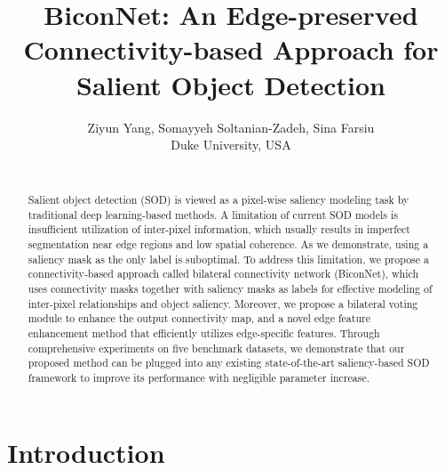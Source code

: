 \documentclass[review]{cvpr}
\begin{document}
\title{BiconNet: An Edge-preserved Connectivity-based Approach for Salient Object Detection}

\author{Ziyun Yang, Somayyeh Soltanian-Zadeh, Sina Farsiu\\
Duke University, USA\\
\\
}

\maketitle


\begin{abstract}
   Salient object detection (SOD) is viewed as a pixel-wise saliency modeling task by traditional deep learning-based methods. A limitation of current SOD models is insufficient utilization of inter-pixel information, which usually results in imperfect segmentation near edge regions and low spatial coherence. As we demonstrate, using a saliency mask as the only label is suboptimal. To address this limitation, we propose a connectivity-based approach called bilateral connectivity network (BiconNet), which uses connectivity masks together with saliency masks as labels for effective modeling of inter-pixel relationships and object saliency. Moreover, we propose a bilateral voting module to enhance the output connectivity map, and a novel edge feature enhancement method that efficiently utilizes edge-specific features. Through comprehensive experiments on five benchmark datasets, we demonstrate that our proposed method can be plugged into any existing state-of-the-art saliency-based SOD framework to improve its performance with negligible parameter increase.
\end{abstract}

\section{Introduction}
\end{document}
